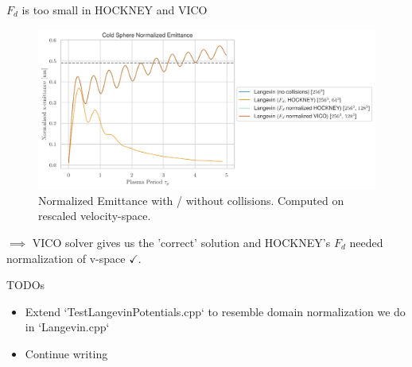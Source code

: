 \begin{frame}[c]{$F_d$ is too small in HOCKNEY and VICO}
    \begin{figure}[!htb]
        \centering
        \captionsetup{justification=centering}
      \includegraphics[width=0.95\linewidth]{figures/normalizedSolve_emittance.pdf}
      \caption{Normalized Emittance with / without collisions. Computed on rescaled velocity-space.}
      \label{fig:emittance}
    \end{figure}
    $\implies$ VICO solver gives us the 'correct' solution and HOCKNEY's $F_d$ needed normalization of v-space $\checkmark$.
\end{frame}

\begin{frame}[t]{TODOs}
    \begin{itemize}
        \item Extend `TestLangevinPotentials.cpp` to resemble domain normalization we do in `Langevin.cpp`
        \item Continue writing
    \end{itemize}
\end{frame}


